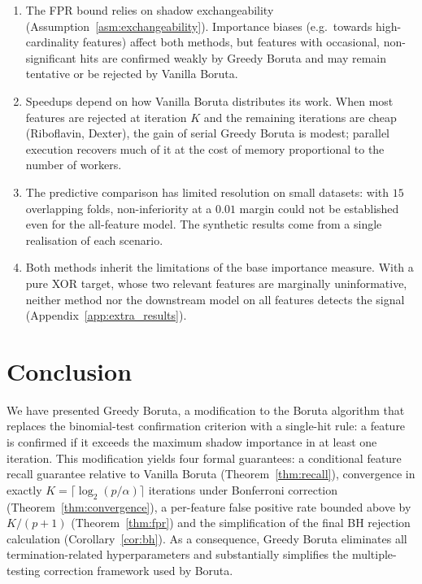 \documentclass[runningheads]{llncs}
\begin{document}
\begin{enumerate}
  \item The FPR bound relies on shadow exchangeability (Assumption~\ref{asm:exchangeability}). Importance biases (e.g.\ towards high-cardinality features) affect both methods, but features with occasional, non-significant hits are confirmed weakly by Greedy Boruta and may remain tentative or be rejected by Vanilla Boruta.
  \item Speedups depend on how Vanilla Boruta distributes its work. When most features are rejected at iteration $K$ and the remaining iterations are cheap (Riboflavin, Dexter), the gain of serial Greedy Boruta is modest; parallel execution recovers much of it at the cost of memory proportional to the number of workers.
  \item The predictive comparison has limited resolution on small datasets: with $15$ overlapping folds, non-inferiority at a $0.01$ margin could not be established even for the all-feature model. The synthetic results come from a single realisation of each scenario.
  \item Both methods inherit the limitations of the base importance measure. With a pure XOR target, whose two relevant features are marginally uninformative, neither method nor the downstream model on all features detects the signal (Appendix~\ref{app:extra_results}).
\end{enumerate}


\section{Conclusion}
\label{sec:conclusion}

We have presented Greedy Boruta, a modification to the Boruta algorithm that replaces the binomial-test confirmation criterion with a single-hit rule: a feature is confirmed if it exceeds the maximum shadow importance in at least one iteration. This modification yields four formal guarantees: a conditional feature recall guarantee relative to Vanilla Boruta (Theorem~\ref{thm:recall}), convergence in exactly $K=\lceil \log_2(p/\alpha)\rceil$ iterations under Bonferroni correction (Theorem~\ref{thm:convergence}), a per-feature false positive rate bounded above by $K/(p+1)$ (Theorem~\ref{thm:fpr}) and the simplification of the final BH rejection calculation (Corollary~\ref{cor:bh}). As a consequence, Greedy Boruta eliminates all termination-related hyperparameters and substantially simplifies the multiple-testing correction framework used by Boruta.
\end{document}
